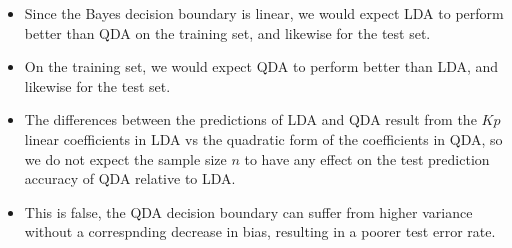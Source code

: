 \begin{itemize}
    \item[(a)] Since the Bayes decision boundary is linear, we would expect LDA
        to perform better than QDA on the training set, and likewise for the test
        set.
    \item[(b)] On the training set, we would expect QDA to perform better than
        LDA, and likewise for the test set.
    \item[(c)] The differences between the predictions of LDA and QDA result from
        the $Kp$ linear coefficients in LDA vs the quadratic form of the
        coefficients in QDA, so we do not expect the sample size $n$ to have any
        effect on the test prediction accuracy of QDA relative to LDA.
    \item[(d)] This is false, the QDA decision boundary can suffer from higher
        variance without a correspnding decrease in bias, resulting in a poorer
        test error rate.
\end{itemize}
